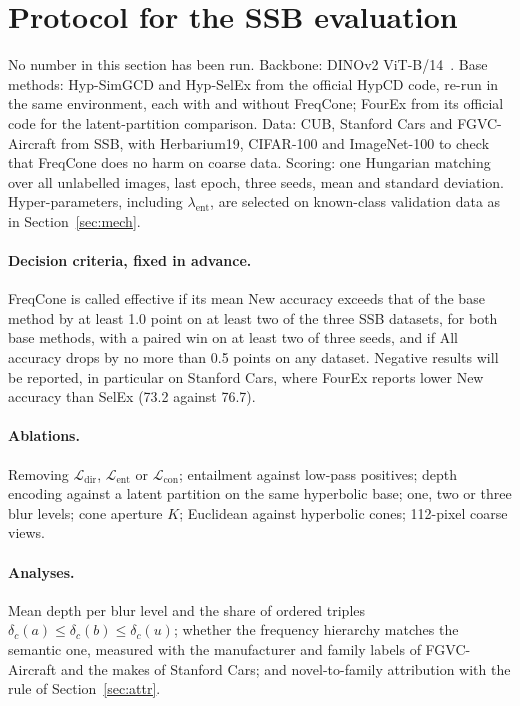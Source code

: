 \documentclass[10pt]{article}
\newcommand{\Lb}{\mathcal{L}}
\begin{document}
\section{Protocol for the SSB evaluation}\label{sec:ssb}
No number in this section has been run. Backbone: DINOv2 ViT-B/14~\cite{oquab2024dinov2}. Base methods:
Hyp-SimGCD and Hyp-SelEx from the official HypCD code, re-run in the same environment, each with and without
FreqCone; FourEx from its official code for the latent-partition comparison. Data: CUB, Stanford Cars and
FGVC-Aircraft from SSB, with Herbarium19, CIFAR-100 and ImageNet-100 to check that FreqCone does no harm on
coarse data. Scoring: one Hungarian matching over all unlabelled images, last epoch, three seeds, mean and
standard deviation. Hyper-parameters, including $\lambda_{\mathrm{ent}}$, are selected on known-class validation
data as in Section~\ref{sec:mech}.

\paragraph{Decision criteria, fixed in advance.} FreqCone is called effective if its mean New accuracy exceeds
that of the base method by at least 1.0 point on at least two of the three SSB datasets, for both base methods,
with a paired win on at least two of three seeds, and if All accuracy drops by no more than 0.5 points on any
dataset. Negative results will be reported, in particular on Stanford Cars, where FourEx reports lower New
accuracy than SelEx (73.2 against 76.7).

\paragraph{Ablations.} Removing $\Lb_{\mathrm{dir}}$, $\Lb_{\mathrm{ent}}$ or $\Lb_{\mathrm{con}}$; entailment
against low-pass positives; depth encoding against a latent partition on the same hyperbolic base; one, two or
three blur levels; cone aperture $K$; Euclidean against hyperbolic cones; 112-pixel coarse views.

\paragraph{Analyses.} Mean depth per blur level and the share of ordered triples
$\delta_c(a)\le\delta_c(b)\le\delta_c(u)$; whether the frequency hierarchy matches the semantic one, measured
with the manufacturer and family labels of FGVC-Aircraft and the makes of Stanford Cars; and novel-to-family
attribution with the rule of Section~\ref{sec:attr}.
\end{document}
